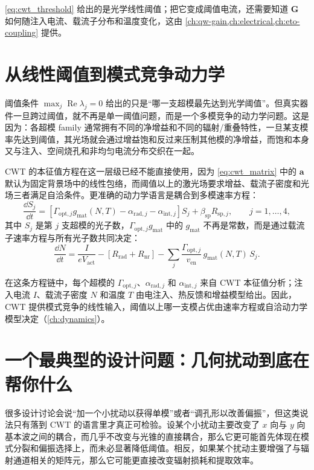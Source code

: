 \cref{eq:cwt_threshold} 给出的是光学线性阈值；把它变成阈值电流，还需要知道 $\bm{G}$ 如何随注入电流、载流子分布和温度变化，这由 \cref{ch:qw-gain,ch:electrical,ch:eto-coupling} 提供。

\section{从线性阈值到模式竞争动力学}
阈值条件 $\max_j\operatorname{Re}\lambda_j=0$ 给出的只是“哪一支超模最先达到光学阈值”。但真实器件一旦跨过阈值，就不再是单一阈值问题，而是一个多模竞争的动力学问题。这是因为：各超模 family 通常拥有不同的净增益和不同的辐射/重叠特性，一旦某支模率先达到阈值，其光场就会通过增益饱和反过来压制其他模的净增益，而饱和本身又与注入、空间烧孔和非均匀电流分布交织在一起。

CWT 的本征值方程在这一层级已经不能直接使用，因为 \cref{eq:cwt_matrix} 中的 $\bm{a}$ 默认为固定背景场中的线性包络，而阈值以上的激光场要求增益、载流子密度和光场三者满足自洽条件。更准确的动力学语言是耦合到多模速率方程：
\begin{equation}
\frac{\dd S_j}{\dd t}
=
\left[\Gamma_{\mathrm{opt},j}g_{\mathrm{mat}}(N,T)
-\alpha_{\mathrm{rad},j}
-\alpha_{\mathrm{int},j}\right]S_j
+\beta_{\mathrm{sp}}R_{\mathrm{sp},j},
\qquad j=1,\ldots,4,
\label{eq:cwt_multimode_rate}
\end{equation}
其中 $S_j$ 是第 $j$ 支超模的光子数，$\Gamma_{\mathrm{opt},j}g_{\mathrm{mat}}$ 中的 $g_{\mathrm{mat}}$ 不再是常数，而是通过载流子速率方程与所有光子数共同决定：
\begin{equation}
\frac{\dd N}{\dd t}
=
\frac{I}{eV_{\mathrm{act}}}
-\left[R_{\mathrm{rad}}+R_{\mathrm{nr}}\right]
-\sum_j \frac{\Gamma_{\mathrm{opt},j}}{v_{\mathrm{en}}}\,
g_{\mathrm{mat}}(N,T)\,S_j.
\label{eq:cwt_carrier_rate}
\end{equation}

在这条方程链中，每个超模的 $\Gamma_{\mathrm{opt},j}$、$\alpha_{\mathrm{rad},j}$ 和 $\alpha_{\mathrm{int},j}$ 来自 CWT 本征值分析；注入电流 $I$、载流子密度 $N$ 和温度 $T$ 由电注入、热反馈和增益模型给出。因此，CWT 提供模式竞争的线性输入，阈值以上哪一支模占优由速率方程或自洽动力学模型决定（\cref{ch:dynamics}）。

\section{一个最典型的设计问题：几何扰动到底在帮你什么}
很多设计讨论会说“加一个小扰动以获得单模”或者“调孔形以改善偏振”，但这类说法只有落到 CWT 的语言里才真正可检验。设某个小扰动主要改变了 $x$ 向与 $y$ 向基本波之间的耦合，而几乎不改变与光锥的直接耦合，那么它更可能首先体现在模式分裂和偏振选择上，而未必显著降低阈值。相反，如果某个扰动主要增强了与辐射通道相关的矩阵元，那么它可能更直接改变辐射损耗和提取效率。

